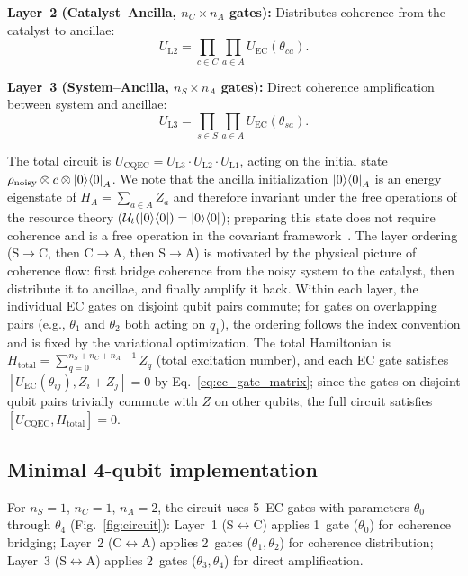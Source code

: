 \documentclass[prx,twocolumn,superscriptaddress,longbibliography,floatfix]{revtex4-2}
\begin{document}
\textbf{Layer~2 (Catalyst--Ancilla, $n_C \times n_A$ gates):}
Distributes coherence from the catalyst to ancillae:
\begin{equation}
U_\mathrm{L2} = \prod_{c \in C} \prod_{a \in A} U_\mathrm{EC}(\theta_{ca}).
\label{eq:layer2}
\end{equation}

\textbf{Layer~3 (System--Ancilla, $n_S \times n_A$ gates):}
Direct coherence amplification between system and ancillae:
\begin{equation}
U_\mathrm{L3} = \prod_{s \in S} \prod_{a \in A} U_\mathrm{EC}(\theta_{sa}).
\label{eq:layer3}
\end{equation}

The total circuit is $U_\mathrm{CQEC} = U_\mathrm{L3} \cdot U_\mathrm{L2} \cdot U_\mathrm{L1}$, acting on the initial state $\rho_\mathrm{noisy} \otimes c \otimes \ket{0}\!\bra{0}_A$.
We note that the ancilla initialization $\ket{0}\!\bra{0}_A$ is an energy eigenstate of $H_A = \sum_{a \in A} Z_a$ and therefore invariant under the free operations of the resource theory ($\mathcal{U}_t(\ket{0}\!\bra{0}) = \ket{0}\!\bra{0}$); preparing this state does not require coherence and is a free operation in the covariant framework~\cite{Marvian2014}.
The layer ordering (S$\to$C, then C$\to$A, then S$\to$A) is motivated by the physical picture of coherence flow: first bridge coherence from the noisy system to the catalyst, then distribute it to ancillae, and finally amplify it back.
Within each layer, the individual EC gates on disjoint qubit pairs commute; for gates on overlapping pairs (e.g., $\theta_1$ and $\theta_2$ both acting on $q_1$), the ordering follows the index convention and is fixed by the variational optimization.
The total Hamiltonian is $H_\mathrm{total} = \sum_{q=0}^{n_S + n_C + n_A - 1} Z_q$ (total excitation number), and each EC gate satisfies $[U_\mathrm{EC}(\theta_{ij}), Z_i + Z_j] = 0$ by Eq.~\eqref{eq:ec_gate_matrix}; since the gates on disjoint qubit pairs trivially commute with $Z$ on other qubits, the full circuit satisfies $[U_\mathrm{CQEC}, H_\mathrm{total}] = 0$.


\subsection{Minimal 4-qubit implementation}
\label{sec:minimal_circuit}

For $n_S = 1$, $n_C = 1$, $n_A = 2$, the circuit uses 5~EC gates with parameters $\theta_0$ through $\theta_4$ (Fig.~\ref{fig:circuit}):
Layer~1 (S$\leftrightarrow$C) applies 1~gate ($\theta_0$) for coherence bridging;
Layer~2 (C$\leftrightarrow$A) applies 2~gates ($\theta_1, \theta_2$) for coherence distribution;
Layer~3 (S$\leftrightarrow$A) applies 2~gates ($\theta_3, \theta_4$) for direct amplification.
\end{document}
